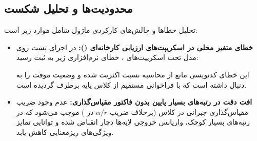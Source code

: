 \subsection{محدودیت‌ها و تحلیل شکست}
تحلیل خطاها و چالش‌های کارکردی ماژول شامل موارد زیر است:
\begin{itemize}
    \item \textbf{خطای متغیر محلی در اسکریپت‌های ارزیابی کارخانه‌ای ():} در اجرای تست روی مدل  تحت اسکریپت‌های ، خطای نرم‌افزاری زیر به ثبت رسید:
    \begin{quote}
    \end{quote}
    این خطای کدنویسی مانع از محاسبه نسبت اکثریت شده و وضعیت موقت  را به دنبال داشته است که با فراخوانی مستقیم از کلاس پایه برطرف گردیده است.
    \item \textbf{افت دقت در رتبه‌های بسیار پایین بدون فاکتور مقیاس‌گذاری:} عدم وجود ضریب مقیاس‌گذاری جبرانی در کلاس  (برخلاف ضریب $\alpha/r$ در ) موجب می‌شود که در رتبه‌های بسیار کوچک، واریانس خروجی لایه‌ها دچار انقباض شده و توانایی تمایز ویژگی‌های ریزمعنایی کاهش یابد.
\end{itemize}
